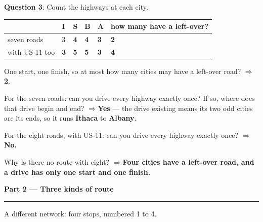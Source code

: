 \documentclass[a4paper, 11pt]{extarticle}
\newcommand{\parthead}[2]{%
  \vspace{0.5em}
  {\large\bfseries Part #1 --- #2}\par
  \vspace{-0.4em}\rule{\textwidth}{0.8pt}\par
  \vspace{0.2em}}
\newcommand{\ans}[1]{\textbf{\textcolor{pltblue!75!black}{#1}}}
\newcommand{\arrow}{\textcolor{pltblue!75!black}{$\Rightarrow$}\;}
\begin{document}
\begin{minipage}{\textwidth}
\setlength{\parskip}{0.4em}

{\bf Question 3}: Count the highways at each city.

\begin{center}
{\setlength{\tabcolsep}{7pt}
\begin{tabular}{|C{3.4cm}|C{1.5cm}|C{1.5cm}|C{1.5cm}|C{1.5cm}|C{3.4cm}|}
\hline
 & \textbf{I} & \textbf{S} & \textbf{B} & \textbf{A} &
\textbf{how many have a left-over?} \\
\hline
seven roads & 3 & \ans{4} & \ans{4} & \ans{3} & \ans{2} \\ \hline
with US-11 too & \ans{3} & \ans{5} & \ans{5} & \ans{3} & \ans{4} \\ \hline
\end{tabular}}
\end{center}

One start, one finish, so at most how many cities may have a left-over road?
\arrow \ans{2}.

For the seven roads: can you drive every highway exactly once? If so, where
does that drive begin and end? \arrow \ans{Yes} --- the drive existing means its
two odd cities are its ends, so it runs \ans{Ithaca} to \ans{Albany}.

For the eight roads, with US-11: can you drive every highway exactly once?
\arrow \ans{No.}

Why is there no route with eight? \arrow \ans{Four cities have a left-over
road, and a drive has only one start and one finish.}

\end{minipage}

\parthead{2}{Three kinds of route}

A different network: four stops, numbered 1 to 4.

\begin{center}
\fournodegraph
\end{center}
\end{document}
